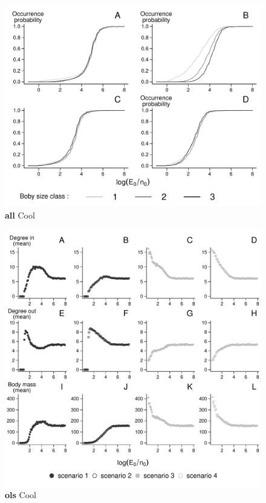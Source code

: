 \begin{figure}[htbp]
\centering
\includegraphics{chapitre4/fig/fig3.pdf}
\caption{\textbf{all} Cool}
\end{figure}

\begin{figure}[htbp]
\centering
\includegraphics{chapitre4/fig/fig4.pdf}
\caption{\textbf{ols} Cool}
\end{figure}

